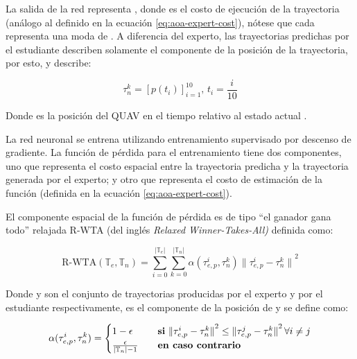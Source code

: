La salida de la red representa , donde  es el costo de ejecución de la trayectoria  (análogo al definido en la ecuación \ref{eq:aoa-expert-cost}), nótese que cada  representa una moda de . A diferencia del experto, las trayectorias predichas por el estudiante describen solamente el componente de la posición de la trayectoria, por esto,  y describe:

\begin{equation}
\label{eq:aoa-network-taun}
    \tau_{n}^{k} = {[p(t_i)]}_{i = 1}^{10}, \, t_i = \frac{i}{10}
\end{equation}

Donde  es la posición del QUAV en el tiempo  relativo al estado actual .

La red neuronal se entrena utilizando entrenamiento supervisado por descenso de gradiente. La función de pérdida para el entrenamiento tiene dos componentes, uno que representa el costo espacial entre la trayectoria predicha y la trayectoria generada por el experto; y otro que representa el costo de estimación de la función  (definida en la ecuación \ref{eq:aoa-expert-cost}).

El componente espacial de la función de pérdida es de tipo ``el ganador gana todo'' relajada R-WTA (del inglés \textit{Relaxed Winner-Takes-All)} definida como:

\begin{equation}
\label{eq:aoa-student-spacial-loss}
    \text{R-WTA}(\mathbb{T}_e, \mathbb{T}_n) = \sum_{i=0}^{|\mathbb{T}_e|} \sum_{k=0}^{|\mathbb{T}_n|} \alpha(\tau_{e,p}^{i}, \tau_{n}^{k}) {\|\tau_{e,p}^{i} - \tau_{n}^{k}\|}^2
\end{equation}

Donde  y  son el conjunto de trayectorias producidas por el experto y por el estudiante respectivamente,  es el componente de la posición de  y  se define como:

\begin{equation}
\label{eq:aoa-student-spacial-alpha}
    \alpha(\tau_{e,p}^{i}, \tau_{n}^{k}) = \begin{cases}
        1 - \epsilon                            & \quad\text{\textbf{si} } {\|\tau_{e,p}^{i} - \tau_{n}^{k}\|}^2 \leq {\|\tau_{e,p}^{j} - \tau_{n}^{k}\|}^2 \, \forall i \ne j \\
        \frac{\epsilon}{|\mathbb{T}_n| - 1}     & \quad\text{\textbf{en caso contrario}}
    \end{cases}
\end{equation}

